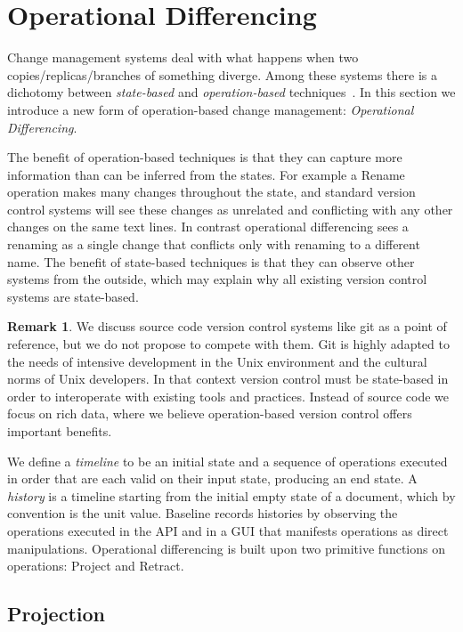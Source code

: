 \documentclass[english,submission]{programming}
\theoremstyle{definition}
\newtheorem*{remark}{Remark}
\begin{document}
\section{Operational Differencing}

Change management systems deal with what happens when two copies/replicas/branches of something diverge.
Among these systems there is a dichotomy between \textit{state-based} and \textit{operation-based} techniques~\cite{diff3, Shapiro11, edit-lenses}.
In this section we introduce a new form of operation-based change management: \textit{Operational Differencing}.

The benefit of operation-based techniques is that they can capture more information than can be inferred from the states.
For example a \textsf{Rename} operation makes many changes throughout the state, and standard version control systems will see these changes as unrelated and conflicting with any other changes on the same text lines. In contrast operational differencing sees a renaming as a single change that conflicts only with renaming to a different name.
The benefit of state-based techniques is that they can observe other systems from the outside, which may explain why all existing version control systems are state-based.

\begin{remark}
We discuss source code version control systems like git as a point of reference, but we do not propose to compete with them. Git is highly adapted to the needs of intensive development in the Unix environment and the cultural norms of Unix developers. In that context version control must be state-based in order to interoperate with existing tools and practices. Instead of source code we focus on rich data, where we believe operation-based version control offers important benefits.
\end{remark}

We define a \textit{timeline} to be an initial state and a sequence of operations executed in order that are each valid on their input state, producing an end state.
A \textit{history} is a timeline starting from the initial empty state of a document, which by convention is the unit value.
Baseline records histories by observing the operations executed in the API and in a GUI that manifests operations as direct manipulations. Operational differencing is built upon two primitive functions on operations: \textsf{Project} and \textsf{Retract}.

\subsection{Projection}
\end{document}
